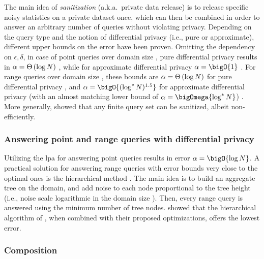 			The main idea of \emph{sanitization} (a.k.a.\ private data release) is to release specific noisy statistics on a private dataset once, which can then be combined in order to answer an arbitrary number of queries without violating privacy.
			Depending on the query type and the notion of differential privacy (i.e., pure or approximate), different upper bounds on the error have been proven.
			Omitting the dependency on $\epsilon,\delta$, in case of point queries over domain size \domainSize{}, pure differential privacy results in $\alpha = \Theta \left( \log N \right)$ \cite{bounds-on-sample-complexity}, while for approximate differential privacy $\alpha = \bigO{1}$ \cite{private-learning-and-sanitization}.
			For range queries over domain size \domainSize{}, these bounds are $\alpha = \Theta \left( \log N \right)$ for pure differential privacy \cite{non-interactive-database-privacy,dp-under-observation}, and $\alpha = \bigO{(\log^{*} \domainSize)^{1.5}}$ for approximate differential privacy (with an almost matching lower bound of $\alpha = \bigOmega{\log^{*} \domainSize}$) \cite{private-learning-and-sanitization, dp-release, privately-learning-thresholds}.
			More generally, \textcite{non-interactive-database-privacy} showed that any finite query set \querySet{} can be sanitized, albeit non-efficiently.

			\subsubsection{Answering point and range queries with differential privacy}

				Utilizing the \acrshort{lpa} for answering point queries results in error $\alpha = \bigO{\log \domainSize}$.
				A practical solution for answering range queries with error bounds very close to the optimal ones is the hierarchical method \cite{dp-under-observation, accuracy-dp-histograms, dp-wavelet}.
				The main idea is to build an aggregate tree on the domain, and add noise to each node proportional to the tree height (i.e., noise scale logarithmic in the domain size \domainSize{}).
				Then, every range query is answered using the minimum number of tree nodes.
				\textcite{hierarchical-methods-for-dp} showed that the hierarchical algorithm of \textcite{accuracy-dp-histograms}, when combined with their proposed optimizations, offers the lowest error.

			\subsubsection{Composition}

